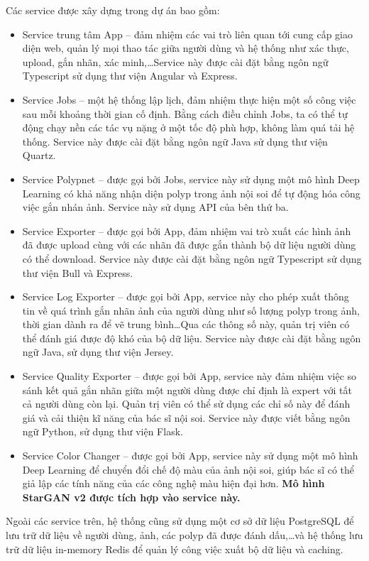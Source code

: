 \documentclass[12pt]{extreport}
\begin{document}
Các service được xây dựng trong dự án bao gồm:
\begin{itemize}
    \item Service trung tâm App – đảm nhiệm các vai trò liên quan tới cung cấp giao diện web, quản lý mọi thao tác giữa người dùng và hệ thống như xác thực, upload, gắn nhãn, xác minh,\dots Service này được cài đặt bằng ngôn ngữ Typescript sử dụng thư viện Angular và Express.
    \item Service Jobs – một hệ thống lập lịch, đảm nhiệm thực hiện một số công việc sau mỗi khoảng thời gian cố định. Bằng cách điều chỉnh Jobs, ta có thể tự động chạy nền các tác vụ nặng ở một tốc độ phù hợp, không làm quá tải hệ thống. Service này được cài đặt bằng ngôn ngữ Java sử dụng thư viện Quartz.
    \item Service Polypnet – được gọi bởi Jobs, service này sử dụng một mô hình Deep Learning có khả năng nhận diện polyp trong ảnh nội soi để tự động hóa công việc gắn nhán ảnh. Service này sử dụng API của bên thứ ba.
    \item Service Exporter – được gọi bởi App, đảm nhiệm vai trò xuất các hình ảnh đã được upload cùng với các nhãn đã được gắn thành bộ dữ liệu người dùng có thể download. Service này được cài đặt bằng ngôn ngữ Typescript sử dụng thư viện Bull và Express.
    \item Service Log Exporter – được gọi bởi App, service này cho phép xuất thông tin về quá trình gắn nhãn ảnh của người dùng như số lượng polyp trong ảnh, thời gian dành ra để vẽ trung bình\dots Qua các thông số này, quản trị viên có thể đánh giá được độ khó của bộ dữ liệu. Service này được cài đặt bằng ngôn ngữ Java, sử dụng thư viện Jersey.
    \item Service Quality Exporter – được gọi bởi App, service này đảm nhiệm việc so sánh kết quả gắn nhãn giữa một người dùng được chỉ định là expert với tất cả người dùng còn lại. Quản trị viên có thể sử dụng các chỉ số này để đánh giá và cải thiện kĩ năng của bác sĩ nội soi. Service này được viết bằng ngôn ngữ Python, sử dụng thư viện Flask.
    \item Service Color Changer – được gọi bởi App, service này sử dụng một mô hình Deep Learning để chuyển đổi chế độ màu của ảnh nội soi, giúp bác sĩ có thể giả lập các tính năng của các công nghệ màu hiện đại hơn. \textbf{Mô hình StarGAN v2 được tích hợp vào service này.}
\end{itemize}

Ngoài các service trên, hệ thống cũng sử dụng một cơ sở dữ liệu PostgreSQL để lưu trữ dữ liệu về người dùng, ảnh, các polyp đã được đánh dấu,\dots và hệ thống lưu trữ dữ liệu in-memory Redis để quản lý công việc xuất bộ dữ liệu và caching.
\end{document}
